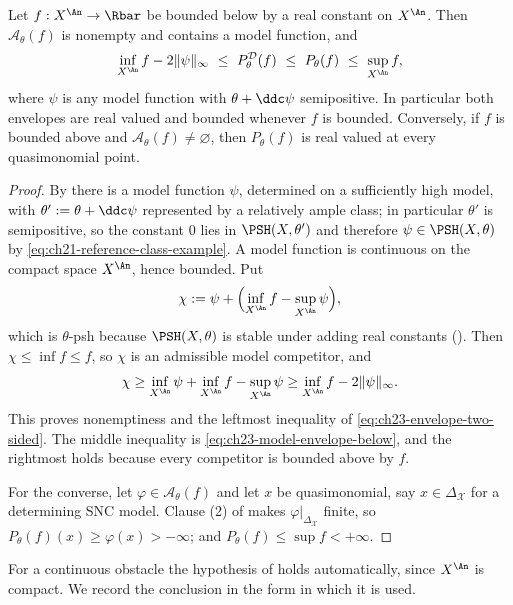 \begin{lemma}\label{lem:ch23-envelope-finiteness}
Let \(f:X^{\An}\to\Rbar\) be bounded below by a real constant on \(X^{\An}\).
Then \(\mathcal A_\theta(f)\) is nonempty and contains a model function, and
\begin{equation}\label{eq:ch23-envelope-two-sided}
 \inf_{X^{\An}}f-2\|\psi\|_\infty
 \ \leq\ P^{\mathcal D}_\theta(f)
 \ \leq\ P_\theta(f)\ \leq\ \sup_{X^{\An}}f ,
\end{equation}
where \(\psi\) is any model function with \(\theta+\ddc\psi\) semipositive.
In particular both envelopes are real valued and bounded whenever \(f\) is
bounded.  Conversely, if \(f\) is bounded above and
\(\mathcal A_\theta(f)\ne\varnothing\), then \(P_\theta(f)\) is real valued
at every quasimonomial point.
\end{lemma}

\begin{proof}
By  there is a model function
\(\psi\), determined on a sufficiently high model, with
\(\theta':=\theta+\ddc\psi\) represented by a relatively ample class; in
particular \(\theta'\) is semipositive, so the constant \(0\) lies in
\(\PSH(X,\theta')\) and therefore \(\psi\in\PSH(X,\theta)\) by
\eqref{eq:ch21-reference-class-example}.  A model function is continuous on
the compact space \(X^{\An}\), hence bounded.  Put
\[
 \chi:=\psi+\Bigl(\inf_{X^{\An}}f-\sup_{X^{\An}}\psi\Bigr),
\]
which is \(\theta\)-psh because \(\PSH(X,\theta)\) is stable under adding
real constants ().  Then
\(\chi\leq\inf f\leq f\), so \(\chi\) is an admissible model competitor, and
\[
 \chi\geq\inf_{X^{\An}}\psi+\inf_{X^{\An}}f-\sup_{X^{\An}}\psi
 \geq\inf_{X^{\An}}f-2\|\psi\|_\infty .
\]
This proves nonemptiness and the leftmost
inequality of \eqref{eq:ch23-envelope-two-sided}.  The middle inequality is
\eqref{eq:ch23-model-envelope-below}, and the rightmost holds because every
competitor is bounded above by \(f\).

For the converse, let \(\varphi\in\mathcal A_\theta(f)\) and let \(x\) be
quasimonomial, say \(x\in\Delta_{\mathcal X}\) for a determining SNC model.
Clause (2) of  makes
\(\varphi|_{\Delta_{\mathcal X}}\) finite, so
\(P_\theta(f)(x)\geq\varphi(x)>-\infty\); and \(P_\theta(f)\leq\sup f<+\infty\).
\end{proof}

For a continuous obstacle the hypothesis of
 holds automatically, since \(X^{\An}\) is
compact.  We record the conclusion in the form in which it is used.


